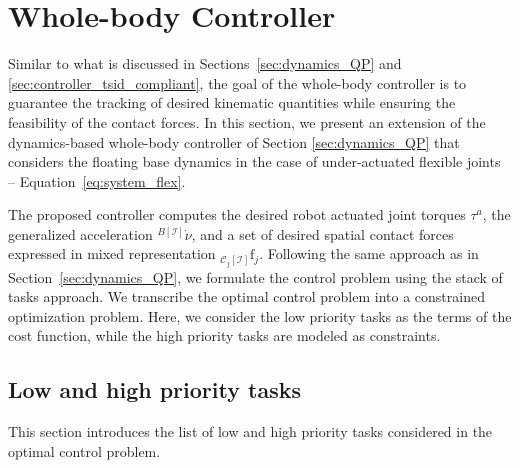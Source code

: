 \section{Whole-body Controller\label{sec:wbc_tsid_flex_joints}}
Similar to what is discussed in Sections~\ref{sec:dynamics_QP} and \ref{sec:controller_tsid_compliant},
the goal of the whole-body controller is to guarantee the tracking of desired kinematic quantities while ensuring the feasibility of the contact forces.
In this section, we present an extension of the dynamics-based whole-body controller of Section
\ref{sec:dynamics_QP} that considers the floating base dynamics in the case of under-actuated flexible joints -- Equation~\eqref{eq:system_flex}.
\par
The proposed controller computes the desired robot actuated joint torques $\tau^a$, the generalized
acceleration ${}^{B[\mathcal{I}]}\dot{\nu}$, and a set of desired spatial contact forces expressed
in mixed representation ${}_{\mathcal{C}_j[\mathcal{I}]}\mathrm{f}_j$. Following the same approach
as in Section~\ref{sec:dynamics_QP}, we formulate the control problem using the stack of tasks
approach. We transcribe the optimal control problem into a constrained optimization problem. Here, we
consider the low priority tasks as the terms of the cost function, while the high priority tasks are modeled as constraints.

\subsection{Low and high priority tasks}
This section introduces the list of low and high priority tasks considered in the optimal control problem.

